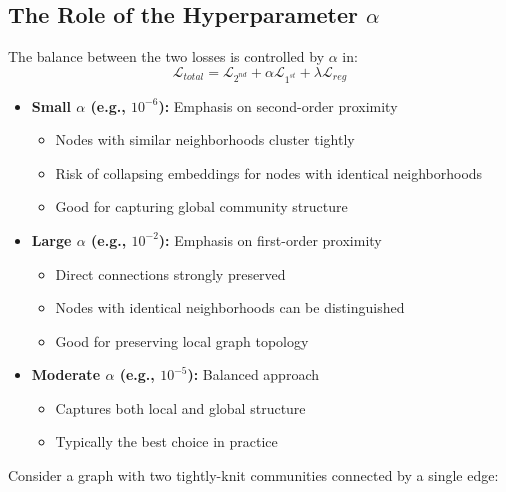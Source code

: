 \begin{notechapter}
\subsection{The Role of the Hyperparameter $\alpha$}

The balance between the two losses is controlled by $\alpha$ in:
\[
\mathcal{L}_{total} = \mathcal{L}_{2^{nd}} + \alpha \mathcal{L}_{1^{st}} + \lambda \mathcal{L}_{reg}
\]

\begin{itemize}
    \item \textbf{Small $\alpha$ (e.g., $10^{-6}$):} Emphasis on second-order proximity
    \begin{itemize}
        \item Nodes with similar neighborhoods cluster tightly
        \item Risk of collapsing embeddings for nodes with identical neighborhoods
        \item Good for capturing global community structure
    \end{itemize}
    \item \textbf{Large $\alpha$ (e.g., $10^{-2}$):} Emphasis on first-order proximity
    \begin{itemize}
        \item Direct connections strongly preserved
        \item Nodes with identical neighborhoods can be distinguished
        \item Good for preserving local graph topology
    \end{itemize}
    \item \textbf{Moderate $\alpha$ (e.g., $10^{-5}$):} Balanced approach
    \begin{itemize}
        \item Captures both local and global structure
        \item Typically the best choice in practice
    \end{itemize}
\end{itemize}

\begin{example}
Consider a graph with two tightly-knit communities connected by a single edge:

\begin{center}
\end{center}
\end{example}
\end{notechapter}
